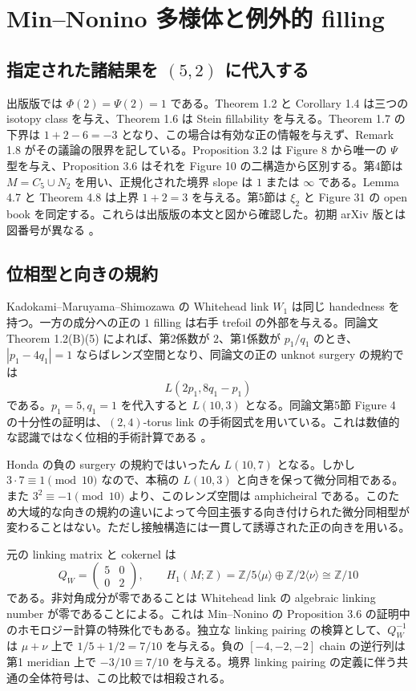 \documentclass[12pt]{amsart}
\theoremstyle{definition}
\theoremstyle{remark}
\numberwithin{equation}{section}
\newcommand{\Z}{\mathbb{Z}}
\theoremstyle{definition}
\begin{document}
\section{Min--Nonino 多様体と例外的 filling}\label{ja-manifold}
\subsection{指定された諸結果を $(5,2)$ に代入する}
出版版では $\Phi(2)=\Psi(2)=1$ である。Theorem 1.2 と Corollary 1.4 は三つの isotopy class を与え、Theorem 1.6 は Stein fillability を与える。Theorem 1.7 の下界は $1+2-6=-3$ となり、この場合は有効な正の情報を与えず、Remark 1.8 がその議論の限界を記している。Proposition 3.2 は Figure 8 から唯一の $\Psi$ 型を与え、Proposition 3.6 はそれを Figure 10 の二構造から区別する。第4節は $M=C_5\cup N_2$ を用い、正規化された境界 slope は $1$ または $\infty$ である。Lemma 4.7 と Theorem 4.8 は上界 $1+2=3$ を与える。第5節は $\xi_2$ と Figure 31 の open book を同定する。これらは出版版の本文と図から確認した。初期 arXiv 版とは図番号が異なる \cite{ja-MN}。

\subsection{位相型と向きの規約}
Kadokami--\allowbreak Maruyama--\allowbreak Shimozawa の Whitehead link $W_1$ は同じ handedness を持つ。一方の成分への正の $1$ filling は右手 trefoil の外部を与える。同論文 Theorem 1.2(B)(5) によれば、第2係数が $2$、第1係数が $p_1/q_1$ のとき、$|p_1-4q_1|=1$ ならばレンズ空間となり、同論文の正の unknot surgery の規約では
\[
L(2p_1,8q_1-p_1)
\]
である。$p_1=5,q_1=1$ を代入すると $L(10,3)$ となる。同論文第5節 Figure 4 の十分性の証明は、$(2,4)$-torus link の手術図式を用いている。これは数値的な認識ではなく位相的手術計算である \cite{ja-KMS}。

Honda の負の surgery の規約ではいったん $L(10,7)$ となる。しかし $3\cdot7\equiv1\pmod {10}$ なので、本稿の $L(10,3)$ と向きを保って微分同相である。また $3^2\equiv-1\pmod {10}$ より、このレンズ空間は amphicheiral である。このため大域的な向きの規約の違いによって今回主張する向き付けられた微分同相型が変わることはない。ただし接触構造には一貫して誘導された正の向きを用いる。

元の linking matrix と cokernel は
\begin{equation}\label{ja-homology}
Q_W=\begin{pmatrix}5&0\\0&2\end{pmatrix},\qquad
H_1(M;\Z)=\Z/5\langle\mu\rangle\oplus\Z/2\langle\nu\rangle\cong\Z/10
\end{equation}
である。非対角成分が零であることは Whitehead link の algebraic linking number が零であることによる。これは Min--Nonino の Proposition 3.6 の証明中のホモロジー計算の特殊化でもある。独立な linking pairing の検算として、$Q_W^{-1}$ は $\mu+\nu$ 上で $1/5+1/2=7/10$ を与える。負の $[-4,-2,-2]$ chain の逆行列は第1 meridian 上で $-3/10\equiv7/10$ を与える。境界 linking pairing の定義に伴う共通の全体符号は、この比較では相殺される。
\end{document}
